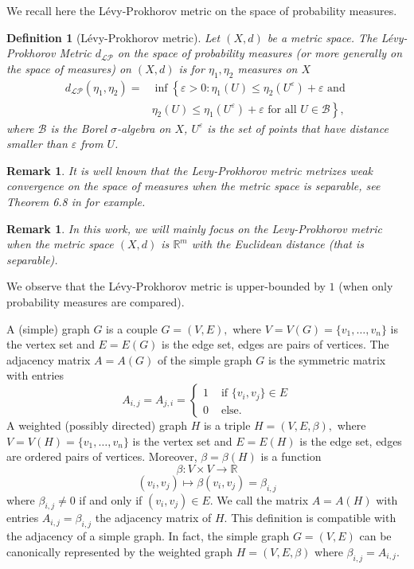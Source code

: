 \documentclass[11pt]{article}
\newtheorem{definition}[theorem]{Definition}
\newtheorem{remark}[theorem]{Remark}
\def\R{\mathbb{R}}
\begin{document}
We recall here the Lévy-Prokhorov metric on the space of probability measures.
\begin{definition}[Lévy-Prokhorov metric]\label{LevyProk}
Let $(X,d)$ be a metric space. The \emph{Lévy-Prokhorov Metric} $d_{\mathcal{LP}}$ on the space of probability measures (or more generally on the space of measures) on $(X,d)$ is for $\eta_1,\eta_2$ measures on $X$
$$\begin{aligned}
d_{\mathcal{LP}}\left(\eta_{1}, \eta_{2}\right)=&\inf \left\{\varepsilon>0: \eta_{1}(U) \leq \eta_{2}\left(U^{\varepsilon}\right)+\varepsilon \text{ and } \right.\\
&\left.\eta_{2}(U) \leq \eta_{1}\left(U^{\varepsilon}\right)+\varepsilon  \text{ for all } U \in \mathcal{B}\right\},
\end{aligned}$$
where $\mathcal{B}$ is the Borel $\sigma$-algebra on $X$, $U^{\varepsilon}$ is the set of points that have distance smaller than $\varepsilon$ from $U$.
\end{definition}
\begin{remark}
It is well known that the Levy-Prokhorov metric metrizes weak convergence on the space of measures when the metric space is separable, see Theorem 6.8 in \cite{billingsley1968convergence} for example.
\end{remark}

\begin{remark}
In this work, we will mainly focus on the Levy-Prokhorov metric when the metric space $(X,d)$ is $\R^m$ with the Euclidean distance (that is separable).
\end{remark}

We observe that the Lévy-Prokhorov metric is upper-bounded by $1$ (when only probability measures are compared).\newline





A (simple) graph $G$ is a couple $G=(V,E),$ where $V=V(G)=\{v_1,\ldots,v_n\}$ is the vertex set and $E=E(G)$ is the edge set, edges are pairs of vertices. The adjacency matrix $A=A(G)$ of the simple graph $G$ is the symmetric matrix with entries
$$
A_{i,j}=A_{j,i}=\begin{cases}
    1 & \text{ if }\{v_i,v_j\}\in E\\
    0 & \text{ else.}
\end{cases}
$$
A weighted (possibly directed) graph $H$ is a triple $H=(V,E,\beta),$ where $V=V(H)=\{v_1,\ldots,v_n\}$ is the vertex set and $E=E(H)$ is the edge set, edges are ordered pairs of vertices. Moreover, $\beta=\beta(H)$ is a function
$$
\beta:V\times V\rightarrow \R
$$
$$
(v_i,v_j)\mapsto \beta(v_i,v_j)=\beta_{i,j}$$
where $\beta_{i,j}\neq 0$ if and only if $(v_i,v_j)\in E.$ We call the matrix $A=A(H)$ with entries $A_{i,j}=\beta_{i,j}$ the adjacency matrix of $H.$ This definition is compatible with the adjacency of a simple graph. In fact, the simple graph $G=(V,E)$ can be canonically represented by the weighted graph $H=(V,E,\beta)$ where $\beta_{i,j}=A_{i,j}.$ 
\end{document}
